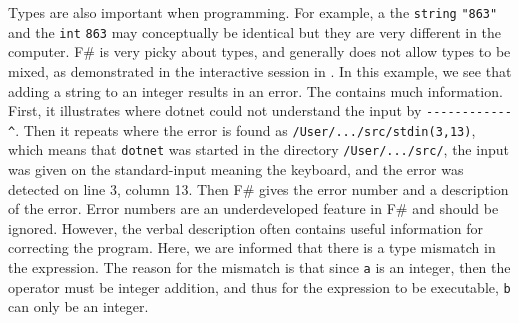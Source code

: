 \documentclass[fsharpNotes.tex]{subfiles}
\begin{document}
Types are also important when programming. For example, a the \lstinline{string} \lstinline{"863"} and the \lstinline{int} \lstinline{863} may conceptually be identical but they are very different in the computer. F\# is very picky about types, and generally does not allow types to be mixed, as demonstrated in the interactive session in .
%
%
In this example, we see that adding a string to an integer results in an error. The  contains much information. First, it illustrates where dotnet could not understand the input by \lstinline{------------^}. Then it repeats where the error is found as \lstinline[language=console]{/User/.../src/stdin(3,13)}, which means that \lstinline[language=console]{dotnet} was started in the directory \lstinline[language=console]{/User/.../src/}, the input was given on the standard-input meaning the keyboard, and the error was detected on line 3, column 13. Then  F\# gives the error number and a description of the error. Error numbers are an underdeveloped feature in F\# and should be ignored. However, the verbal description often contains useful information for correcting the program. Here, we are informed that there is a type mismatch in the expression. The reason for the mismatch is that since \lstinline{a} is an integer, then the \lexeme{+} operator must be integer addition, and thus for the expression to be executable, \lstinline{b} can only be an integer.
\end{document}
